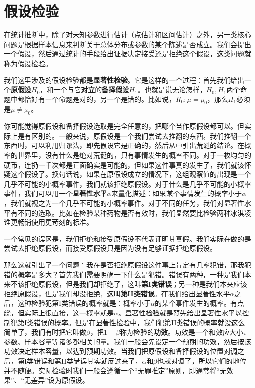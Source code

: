 \section{假设检验}
在统计推断中，除了对未知参数进行估计（点估计和区间估计）之外，另一类核心问题是根据样本信息来判断关于总体分布或参数的某个陈述是否成立。我们会提出一个假设，然后通过统计的手段给出证据决定接受还是拒绝这个假设，这类问题就称为假设检验。

我们这里涉及的假设检验都是\textbf{显著性检验}。它是这样的一个过程：首先我们给出一个\textbf{原假设}$H_0$，和一个与它\textbf{对立}的\textbf{备择假设}$H_1$。也就是说无论怎样，$H_0,H_1$两个命题中都恰好有一个命题是对的，另一个是错的。比如说，$H_0:\mu=\mu_0$，那么$H_1$必须是$\mu\neq \mu_0$。

你可能觉得原假设和备择假设选取是完全任意的，把哪个当作原假设都可以。但实际上是有区别的。一般来说，原假设是一个我们尝试去推翻的东西。我们推翻一个东西时，可以利用归谬法，即先假设它是正确的，然后从中引出荒诞的结论。在概率的世界里，没有什么是绝对荒诞的，只有事情发生的概率不同。对于一枚均匀的硬币，连扔一千次都是正面确实是可能的，但如果这件事真的发生了，我们就该怀疑这个假设了。换句话说，如果在原假设成立的情况下，这组观察值的出现是一个几乎不可能的小概率事件，我们就该拒绝原假设。对于什么是几乎不可能的小概率事件，我们可以用一个\textbf{显著性水平}$\alpha$来量化描述：如果某个事情发生的概率小于$\alpha$，我们就视之为一个几乎不可能的小概率事件。对于不同的任务，我们对显著性水平有不同的选取。比如在检验某种药物是否有效时，我们显然要比检验两种冰淇凌谁更畅销使用更苛刻的标准。

一个常见的误区是，我们拒绝和接受原假设不代表证明其真假。我们实际在做的是尝试去拒绝原假设，而接受原假设只是因为没有足够证据拒绝原假设。

那么这就引出了一个问题：我在是否拒绝原假设这件事上肯定有几率犯错，那我犯错的概率是多大？首先我们需要明确一下什么是犯错。错误有两种，一种是我们本来不该拒绝原假设，但是我们却拒绝了，这叫\textbf{第I类错误}；另一种是我们本来应该拒绝原假设，但是我们却没拒绝，这叫\textbf{第II类错误}。在我们给出显著性水平$\alpha$之后，这种检验犯第I类错误的概率就是：概率小于$\alpha$的某个事件发生的概率。有点绕，但实际上很直接，这一概率就是$\alpha$。显著性检验就是预先给出显著性水平以控制犯第I类错误的概率。但是在显著性检验中，我们犯第II类错误的概率就没这么简单了，我们有时把它叫做$\beta$，把$1-\beta$称为检验的\textbf{功效}。功效是一个和效应大小、参数、样本容量等诸多都相关的量。我们一般会先设定一个预期的功效，然后按该功效决定样本容量，以达到预期功效。当我们把原假设和备择假设的位置对调之后，第I类错误和第II类错误其实就反过来了，$\alpha$和$\beta$也就对调了，所以它们的地位并不随便。实际检验时我们一般会遵循一个“无罪推定”原则，即通常将“无效果”、“无差异”设为原假设。

